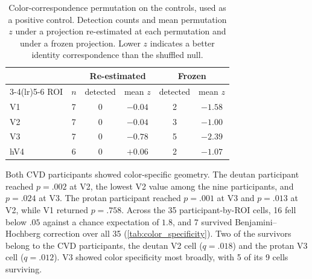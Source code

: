 \begin{table}[h]
\centering
\caption{Color-correspondence permutation on the controls, used as a positive control. Detection counts and mean permutation $z$ under a projection re-estimated at each permutation and under a frozen projection. Lower $z$ indicates a better identity correspondence than the shuffled null.}
\label{tab:frozen_control}
\begin{tabular}{lccccc}
\toprule
 & & \multicolumn{2}{c}{Re-estimated} & \multicolumn{2}{c}{Frozen} \\
\cmidrule(lr){3-4}\cmidrule(lr){5-6}
ROI & $n$ & detected & mean $z$ & detected & mean $z$ \\
\midrule
V1  & 7 & 0 & $-0.04$ & 2 & $-1.58$ \\
V2  & 7 & 0 & $-0.04$ & 3 & $-1.00$ \\
V3  & 7 & 0 & $-0.78$ & 5 & $-2.39$ \\
hV4 & 6 & 0 & $+0.06$ & 2 & $-1.07$ \\
\bottomrule
\end{tabular}
\end{table}

Both CVD participants showed color-specific geometry. The deutan participant reached $p = .002$ at V2, the lowest V2 value among the nine participants, and $p = .024$ at V3. The protan participant reached $p = .001$ at V3 and $p = .013$ at V2, while V1 returned $p = .758$. Across the 35 participant-by-ROI cells, 16 fell below $.05$ against a chance expectation of $1.8$, and 7 survived Benjamini--Hochberg correction over all 35 (\cref{tab:color_specificity}). Two of the survivors belong to the CVD participants, the deutan V2 cell ($q = .018$) and the protan V3 cell ($q = .012$). V3 showed color specificity most broadly, with 5 of its 9 cells surviving.

